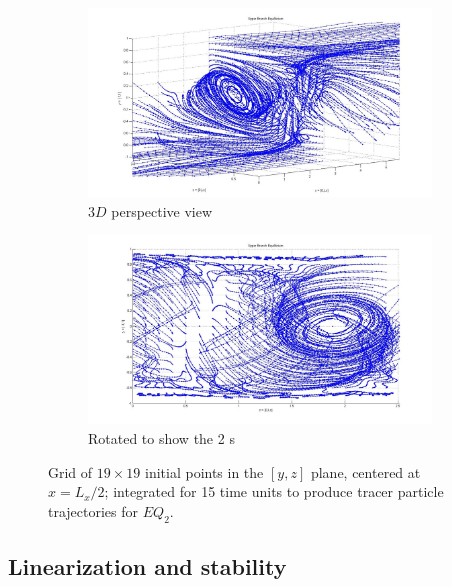 \documentclass[letter,12pt,openany]{article}
\begin{document}
\begin{figure}[!h]
\centering
    \begin{subfigure}{0.98\textwidth}
    \includegraphics[width=1.0\textwidth]{fig_UB1.jpg}
      \caption{
        $3D$ perspective view
       }
      \label{fig:UBs_a}
    \end{subfigure}

    \begin{subfigure}{0.98\textwidth}
    \includegraphics[width=1.0\textwidth]{fig_UB1eq.jpg}
      \caption{
        Rotated to show the 2 \stagp s
       }
      \label{fig:UBs_b}
    \end{subfigure}
    \caption{
Grid of $19 \times 19$  initial points in the $[y,z]$ plane, centered at 
$x = L_x/2$; integrated for 15 time units to produce tracer particle 
trajectories for $EQ_2$.} 
\label{fig:UBs}
 \end{figure}


\subsection{Linearization and stability}
\end{document}

